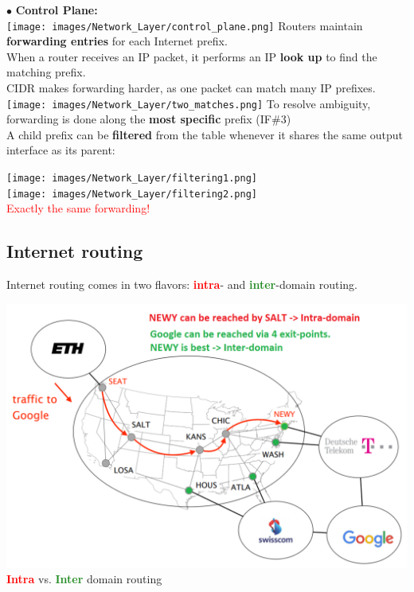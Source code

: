 \documentclass[a4paper, fontsize=8pt, landscape, DIV=1]{scrartcl}
\begin{document}
\begin{multicols*}{4}
		$\bullet$ \textbf{Control Plane:}\\
		\texttt{[image: images/Network\_Layer/control\_plane.png]}
		Routers maintain \textbf{forwarding entries} for each Internet prefix.\\
		When a router receives an IP packet, it performs an IP \textbf{look up} to
		find the matching prefix.\\
		CIDR makes forwarding harder, as one packet can match many IP prefixes.\\
		\texttt{[image: images/Network\_Layer/two\_matches.png]}
		To resolve ambiguity, forwarding is done along the \textbf{most specific}
		prefix (IF\#3)\\
		A child prefix can be \textbf{filtered} from the table whenever it shares
		the same output interface as its parent:\\
		\begin{center}
			\texttt{[image: images/Network\_Layer/filtering1.png]}\\
			\texttt{[image: images/Network\_Layer/filtering2.png]}\\
			\textcolor{Red}{Exactly the same forwarding!}
		\end{center}

		\subsection{Internet routing}
		Internet routing comes in two flavors: \textcolor{Red}{\textbf{intra}}- and
		\textcolor{ForestGreen}{\textbf{inter}}-domain routing.
		
		\includegraphics[width=\columnwidth]{images/Network_Layer/intra_vs_inter.png}
		\textcolor{Red}{\textbf{Intra}} vs. \textcolor{ForestGreen}{\textbf{Inter}}
		domain routing
		\begin{center}
			

\end{center}
\end{multicols*}
\end{document}

